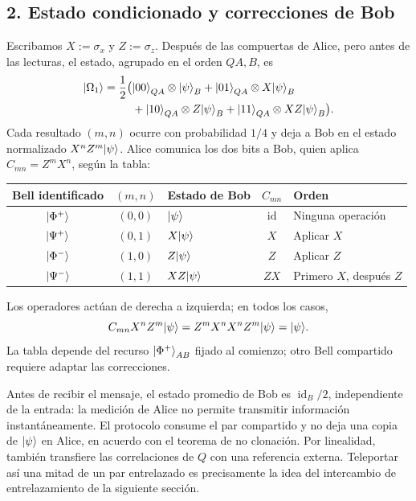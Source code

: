 \documentclass[letterpaper,12pt]{article}
\DeclareMathOperator{\id}{id}
\numberwithin{equation}{section}
\begin{document}
\subsection*{2. Estado condicionado y correcciones de Bob}
Escribamos $X:=\sigma_x$ y $Z:=\sigma_z$. Después de las compuertas de
Alice, pero antes de las lecturas, el estado, agrupado en el orden $QA,B$, es
\begin{equation}
  \begin{aligned}
    {\vert \Omega_1 \rangle}=\frac12\bigl(&{\vert 00 \rangle}_{QA}\otimes{\vert \psi \rangle}_B
       +{\vert 01 \rangle}_{QA}\otimes X{\vert \psi \rangle}_B\\
       &+{\vert 10 \rangle}_{QA}\otimes Z{\vert \psi \rangle}_B
       +{\vert 11 \rangle}_{QA}\otimes XZ{\vert \psi \rangle}_B\bigr).
  \end{aligned}
\end{equation}
Cada resultado $(m,n)$ ocurre con probabilidad $1/4$ y deja a Bob en el
estado normalizado $X^nZ^m{\vert \psi \rangle}$. Alice comunica los dos bits a Bob,
quien aplica $C_{mn}=Z^mX^n$, según la tabla:
\begin{center}
\small
\begin{tabular}{cclcl}
  Bell identificado & $(m,n)$ & Estado de Bob & $C_{mn}$ & Orden\\ \hline
  ${\vert \Phi^+ \rangle}$ & $(0,0)$ & ${\vert \psi \rangle}$ & $\id$ & Ninguna operación\\
  ${\vert \Psi^+ \rangle}$ & $(0,1)$ & $X{\vert \psi \rangle}$ & $X$ & Aplicar $X$\\
  ${\vert \Phi^- \rangle}$ & $(1,0)$ & $Z{\vert \psi \rangle}$ & $Z$ & Aplicar $Z$\\
  ${\vert \Psi^- \rangle}$ & $(1,1)$ & $XZ{\vert \psi \rangle}$ & $ZX$ & Primero $X$, después $Z$
\end{tabular}
\end{center}
Los operadores actúan de derecha a izquierda; en todos los casos,
\[
  C_{mn}X^nZ^m{\vert \psi \rangle}
  =Z^mX^nX^nZ^m{\vert \psi \rangle}={\vert \psi \rangle}.
\]
La tabla depende del recurso ${\vert \Phi^+ \rangle}_{AB}$ fijado al comienzo;
otro Bell compartido requiere adaptar las correcciones.

Antes de recibir el mensaje, el estado promedio de Bob es $\id_B/2$,
independiente de la entrada: la medición de Alice no permite transmitir
información instantáneamente. El protocolo consume el par compartido y
no deja una copia de ${\vert \psi \rangle}$ en Alice, en acuerdo con el teorema de
no clonación. Por linealidad, también transfiere las correlaciones de $Q$
con una referencia externa. Teleportar así una mitad de un par entrelazado
es precisamente la idea del intercambio de entrelazamiento de la siguiente
sección.
\end{document}
